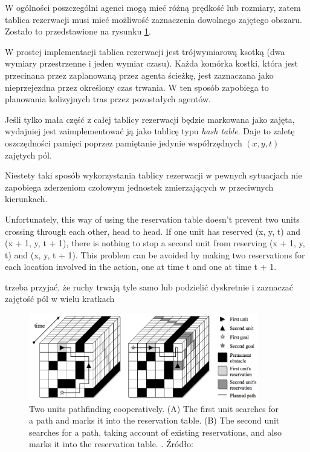 W ogólności poszczególni agenci mogą mieć różną prędkość lub rozmiary, zatem tablica rezerwacji musi mieć możliwość zaznaczenia dowolnego zajętego obszaru. Zostało to przedstawione na rysunku \ref{fig:img_reservation-table}.

W prostej implementacji tablica rezerwacji jest trójwymiarową ksotką (dwa wymiary przestrzenne i jeden wymiar czasu).
Każda komórka kostki, która jest przecinana przez zaplanowaną przez agenta ścieżkę, jest zaznaczana jako nieprzejezdna przez określony czas trwania. W ten sposób zapobiega to planowania kolizyjnych tras przez pozostałych agentów.

Jeśli tylko mała część z całej tablicy rezerwacji będzie markowana jako zajęta, wydajniej jest zaimplementować ją jako tablicę typu {\it hash table}. Daje to zaletę oszczędności pamięci poprzez pamiętanie jedynie współrzędnych $(x, y, t)$ zajętych pól.

Niestety taki sposób wykorzystania tablicy rezerwacji w pewnych sytuacjach nie zapobiega zderzeniom czołowym jednostek zmierzających w przeciwnych kierunkach.


Unfortunately, this way of using the reservation table doesn’t prevent two units crossing
through each other, head to head. If one unit has reserved (x, y, t) and (x + 1, y, t + 1),
there is nothing to stop a second unit from reserving (x + 1, y, t) and (x, y, t + 1). This
problem can be avoided by making two reservations for each location involved in the
action, one at time t and one at time t + 1.
\cite{cooppath}

trzeba przyjać, że ruchy trwają tyle samo lub podzielić dyskretnie i zaznaczać zajętość pól w wielu kratkach

\begin{figure}[H]
	\centering
	\includegraphics[width=10cm]{img/reservation-table}
	\caption{Two units pathfinding cooperatively. (A) The first unit searches for a path and
marks it into the reservation table. (B) The second unit searches for a path, taking account
of existing reservations, and also marks it into the reservation table.
. Źródło: \cite{async_cooppath_spacetime_cp}}
	\label{fig:img_reservation-table}
\end{figure}

